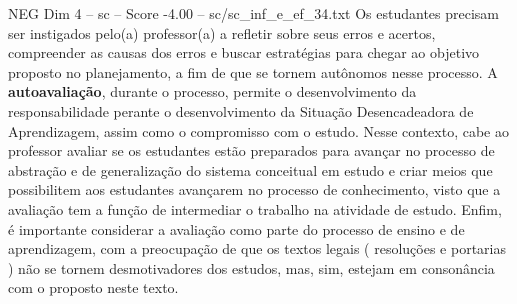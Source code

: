 \begin{textsample}{NEG Dim 4 – sc – Score -4.00 – sc/sc\_inf\_e\_ef\_34.txt}
Os estudantes precisam ser instigados pelo(a) professor(a) a refletir sobre seus erros e acertos, compreender as causas dos erros e buscar estratégias para chegar ao objetivo proposto no planejamento, a fim de que se tornem autônomos nesse processo.
A \textbf{autoavaliação}, durante o processo, permite o desenvolvimento da responsabilidade perante o desenvolvimento da Situação Desencadeadora de Aprendizagem, assim como o compromisso com o estudo.
Nesse contexto, cabe ao professor avaliar se os estudantes estão preparados para avançar no processo de abstração e de generalização do sistema conceitual em estudo e criar meios que possibilitem aos estudantes avançarem no processo de conhecimento, visto que a avaliação tem a função de intermediar o trabalho na atividade de estudo.
Enfim, é importante considerar a avaliação como parte do processo de ensino e de aprendizagem, com a preocupação de que os textos legais ( resoluções e portarias ) não se tornem desmotivadores dos estudos, mas, sim, estejam em consonância com o proposto neste texto.

\end{textsample}
